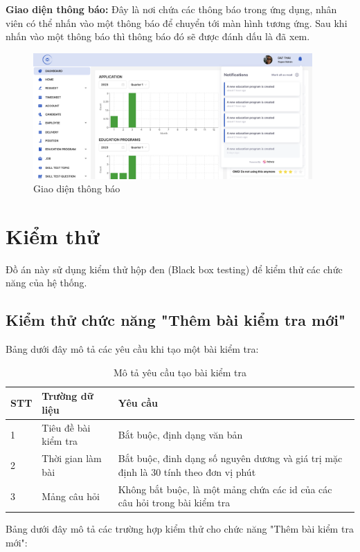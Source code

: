 \documentclass[../DoAn.tex]{subfiles}
\begin{document}
\textbf{Giao diện thông báo:}
Đây là nơi chứa các thông báo trong ứng dụng, nhân viên có thể nhấn vào một thông báo để chuyển tới màn hình tương ứng. Sau khi nhấn vào một thông báo thì thông báo đó sẽ được đánh dấu là đã xem.
\begin{figure}[H]
    \centering
    \includegraphics[width=0.95\textwidth]{Hinhve/ThongBao.png}
    \caption{Giao diện thông báo}
\end{figure}


\section{Kiểm thử}
Đồ án này sử dụng kiểm thử hộp đen (Black box testing) để kiểm thử các chức năng của hệ thống.

\subsection{Kiểm thử chức năng "Thêm bài kiểm tra mới"}

Bảng dưới đây mô tả các yêu cầu khi tạo một bài kiểm tra:
\begin{longtable}{|p{}|p{}|p{}|}
\caption{Mô tả yêu cầu tạo bài kiểm tra}
\label{fig:AddInterview}
\hline
\textbf{STT} & \textbf{Trường dữ liệu} & \textbf{Yêu cầu}\\ \hline
1 & Tiêu đề bài kiểm tra & Bắt buộc, định dạng văn bản \\ \hline
2 & Thời gian làm bài & Bắt buộc, đinh dạng số nguyên dương và giá trị mặc định là 30 tính theo đơn vị phút \\ \hline
3 & Mảng câu hỏi & Không bắt buộc, là một mảng chứa các id của các câu hỏi trong bài kiểm tra \\ \hline
\end{longtable}
Bảng dưới đây mô tả các trường hợp kiểm thử cho chức năng "Thêm bài kiểm tra mới":
\end{document}
